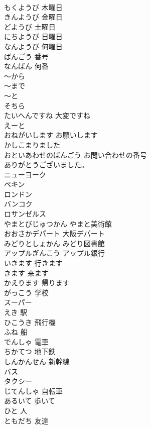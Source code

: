 \documentclass[8pt]{extreport}
\begin{document}
\begin{CJK}{UTF8}{min}
\\	もくようび	木曜日	
\\	きんようび	金曜日	
\\	どようび	土曜日	
\\	にちようび	日曜日	
\\	なんようび	何曜日	
\\	ばんごう	番号	
\\	なんばん	何番	
\\	～から			
\\	～まで			
\\	～と			
\\	そちら			
\\	たいへんですね	大変ですね	
\\	えーと			
\\	おねがいします	お願いします	
\\	かしこまりました			
\\	おといあわせのばんごう	お問い合わせの番号	
\\	[どうも]ありがとうございました。			
\\	ニューヨーク			
\\	ペキン			
\\	ロンドン			
\\	バンコク			
\\	ロサンゼルス			
\\	やまとびじゅつかん	やまと美術館	
\\	おおさかデパート	大阪デパート	
\\	みどりとしょかん	みどり図書館	
\\	アップルぎんこう	アップル銀行	
\\	いきます	行きます	
\\	きます	来ます	
\\	かえります	帰ります	
\\	がっこう	学校	
\\	スーパー			
\\	えき	駅	
\\	ひこうき	飛行機	
\\	ふね	船	
\\	でんしゃ	電車	
\\	ちかてつ	地下鉄	
\\	しんかんせん	新幹線	
\\	バス			
\\	タクシー			
\\	じてんしゃ	自転車	
\\	あるいて	歩いて	
\\	ひと	人	
\\	ともだち	友達	

\end{CJK}
\end{document}

